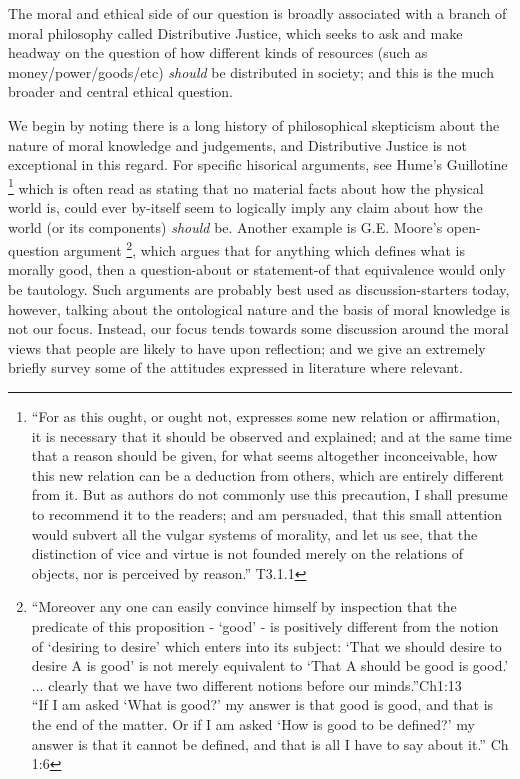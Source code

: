 
The moral and ethical side of our question is broadly associated with a branch of moral philosophy called Distributive Justice, which seeks to ask and make headway on the question of how different kinds of resources (such as money/power/goods/etc) \textit{should} be distributed in society; and this is the much broader and central ethical question.

We begin by noting there is a long history of philosophical skepticism about the nature of moral knowledge and judgements, and Distributive Justice is not exceptional in this regard.
For specific hisorical arguments, see Hume's Guillotine \cite{HumeGutenberg}\footnote{``For as this ought, or ought not, expresses some new relation or affirmation, it is necessary that it should be observed and explained; and at the same time that a reason should be given, for what seems altogether inconceivable, how this new relation can be a deduction from others, which are entirely different from it. But as authors do not commonly use this precaution, I shall presume to recommend it to the readers; and am persuaded, that this small attention would subvert all the vulgar systems of morality, and let us see, that the distinction of vice and virtue is not founded merely on the relations of objects, nor is perceived by reason.'' T3.1.1} which is often read as stating that no material facts about how the physical world is, could ever by-itself seem to logically imply any claim about how the world (or its components) \textit{should} be.
Another example is G.E. Moore's open-question argument \cite{MooreGutenberg}\footnote{
``Moreover any one can easily convince himself by inspection that the predicate of this proposition - `good' - is positively different from the notion of `desiring to desire' which enters into its subject: `That we should desire to desire A is good' is not merely equivalent to `That A should be good is good.' ... clearly that we have two different notions before our minds.''Ch1:13\\
``If I am asked `What is good?' my answer is that good is good, and that is the end of the matter. Or if I am asked `How is good to be defined?' my answer is that it cannot be defined, and that is all I have to say about it.'' Ch 1:6}, which argues that for anything which defines what is morally good, then a question-about or statement-of that equivalence would only be tautology.
Such arguments are probably best used as discussion-starters today, however, talking about the ontological nature and the basis of moral knowledge is not our focus.
Instead, our focus tends towards some discussion around the moral views that people are likely to have upon reflection; and we give an extremely briefly survey some of the attitudes expressed in literature where relevant.

